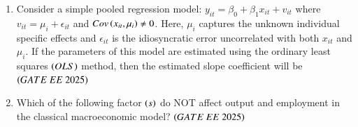 \documentclass[journal,12pt,onecolumn]{IEEEtran}
\theoremstyle{remark}
\begin{document}
\begin{enumerate}
\item Consider a simple pooled regression model: $y_{it} = \beta_0 + \beta_1 x_{it} + v_{it}$ where $v_{it} = \mu_i + \epsilon_{it}$ and $Cov \left(x_{it},\mu_{i}\right) \neq 0$. Here, $\mu_{i}$ captures the unknown individual specific effects and $\epsilon_{it}$ is the idiosyncratic error uncorrelated with both $x_{it}$ and $\mu_{i}$. If the parameters of this model are estimated using the ordinary least squares  $\left(OLS\right)$ method, then the estimated slope coefficient will be
\hfill $\left(GATE\ EE\ 2025\right)$
    \begin{enumerate}
      \end{enumerate}
 
\item Which of the following factor $\left(s\right)$ do NOT affect output and employment in the classical macroeconomic model?
\hfill $\left(GATE\ EE\ 2025\right)$
    \begin{enumerate}
      \end{enumerate}
 

\end{enumerate}
\end{document}
